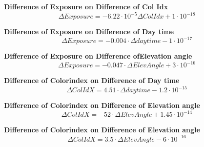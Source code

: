 \documentclass  [
  paper    = a4,
  BCOR     = 10mm,
  twoside,
  fontsize = 12pt,
  fleqn,
  toc      = bibnumbered,
  toc      = listofnumbered,
  numbers  = noendperiod,
  headings = normal,
  listof   = leveldown,
  version  = 3.03
]                                       {scrreprt}
\begin{document}
\begin{appendix}
	\textbf{Difference of Exposure on  Difference of  Col Idx}
	\begin{equation}
	\Delta Exposure  =-6.22\cdot 10^{-5} \Delta Col Idx  +1\cdot 10^{-18}
	\end{equation}
	
	\textbf{Difference of  Exposure on  Difference of Day time}
	\begin{equation}
	\Delta Exposure  =-0.004\cdot \Delta daytime -1\cdot 10^{-17}
	\end{equation}
	
	\textbf{Difference of  Exposure  on  Difference ofElevation angle}
	\begin{equation}
	\Delta Exposure  =-0.047\cdot \Delta  ElevAngle +3\cdot 10^{-16}
	\end{equation}
	
	
	\textbf{Difference of  Colorindex  on  Difference of Day time}
	\begin{equation}
	\Delta ColIdX  =4.51\cdot \Delta daytime-1.2\cdot 10^{-15}
	\end{equation}
	
	\textbf{Difference of  Colorindex  on  Difference of Elevation angle}
	\begin{equation}
	\Delta ColIdX  =-52\cdot \Delta ElevAngle+ 1.45\cdot 10^{-14}
	\end{equation}
	
	\textbf{Difference of  Colorindex  on  Difference of Elevation angle}
	\begin{equation}
	\Delta ColIdX  =3.5\cdot \Delta ElevAngle-6\cdot 10^{-16}
	\end{equation}

\end{appendix}
\end{document}
